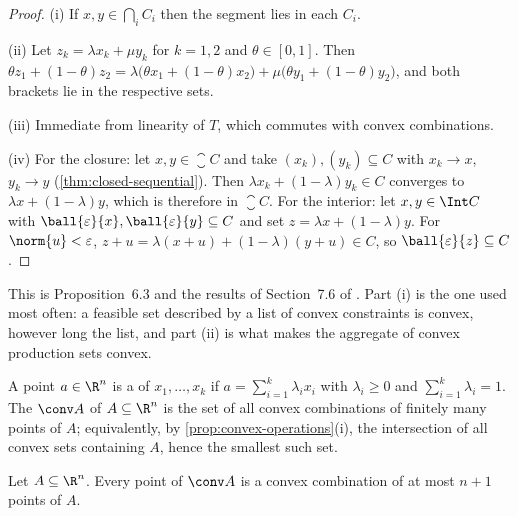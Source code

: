 \begin{proof}
	(i) If $x,y\in\bigcap_iC_i$ then the segment lies in each $C_i$.

	(ii) Let $z_k=\lambda x_k+\mu y_k$ for $k=1,2$ and $\theta\in[0,1]$. Then
	$\theta z_1+(1-\theta)z_2=\lambda\bigl(\theta x_1+(1-\theta)x_2\bigr)
		+\mu\bigl(\theta y_1+(1-\theta)y_2\bigr)$, and both brackets lie in the
	respective sets.

	(iii) Immediate from linearity of $T$, which commutes with convex combinations.

	(iv) For the closure: let $x,y\in\closure C$ and take
	$(x_k),(y_k)\subseteq C$ with $x_k\to x$, $y_k\to y$
	(\autoref{thm:closed-sequential}). Then
	$\lambda x_k+(1-\lambda)y_k\in C$ converges to $\lambda x+(1-\lambda)y$, which
	is therefore in $\closure C$. For the interior: let $x,y\in\Int C$ with
	$\ball{\varepsilon}{x},\ball{\varepsilon}{y}\subseteq C$ and set
	$z=\lambda x+(1-\lambda)y$. For $\norm{u}<\varepsilon$,
	$z+u=\lambda(x+u)+(1-\lambda)(y+u)\in C$, so
	$\ball{\varepsilon}{z}\subseteq C$.
\end{proof}

This is Proposition~6.3 and the results of Section~7.6 of
\textcite{fukuda2026notes}. Part (i) is the one used most often: a feasible set
described by a list of convex constraints is convex, however long the list, and
part (ii) is what makes the aggregate of convex production sets convex.

\begin{definition}\label{def:convex-hull}
	A point $a\in\R^n$ is a  of $x_1,\dots,x_k$ if
	$a=\sum_{i=1}^k\lambda_ix_i$ with $\lambda_i\geq0$ and
	$\sum_{i=1}^k\lambda_i=1$. The  $\conv A$ of $A\subseteq\R^n$
	is the set of all convex combinations of finitely many points of $A$;
	equivalently, by \autoref{prop:convex-operations}(i), the intersection of all
	convex sets containing $A$, hence the smallest such set.
\end{definition}

\begin{theorem}\label{thm:caratheodory}
	Let $A\subseteq\R^n$. Every point of $\conv A$ is a convex combination of at
	most $n+1$ points of $A$.
\end{theorem}

